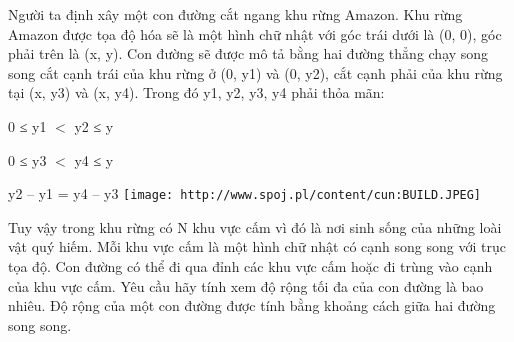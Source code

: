 Người ta định xây một con đường cắt ngang khu rừng Amazon. Khu rừng Amazon được tọa độ hóa sẽ là một hình chữ nhật với góc trái dưới là (0, 0), góc phải trên là (x, y). Con đường sẽ được mô tả bằng hai đường thẳng chạy song song cắt cạnh trái của khu rừng ở (0, y1) và (0, y2), cắt cạnh phải của khu rừng tại (x, y3) và (x, y4). Trong đó y1, y2, y3, y4 phải thỏa mãn:  

   0 ≤ y1 $<$ y2 ≤ y  

   0 ≤ y3 $<$ y4 ≤ y  

   y2 – y1 = y4 – y3  
\texttt{[image: http://www.spoj.pl/content/cun:BUILD.JPEG]}

   Tuy vậy trong khu rừng có N khu vực cấm vì đó là nơi sinh sống của những loài vật quý hiếm. Mỗi khu vực cấm là một hình chữ nhật có cạnh song song với trục tọa độ. Con đường có thể đi qua đỉnh các khu vực cấm hoặc đi trùng vào cạnh của khu vực cấm. Yêu cầu hãy tính xem độ rộng tối đa của con đường là bao nhiêu. Độ rộng của một con đường được tính bằng khoảng cách giữa hai đường song song.